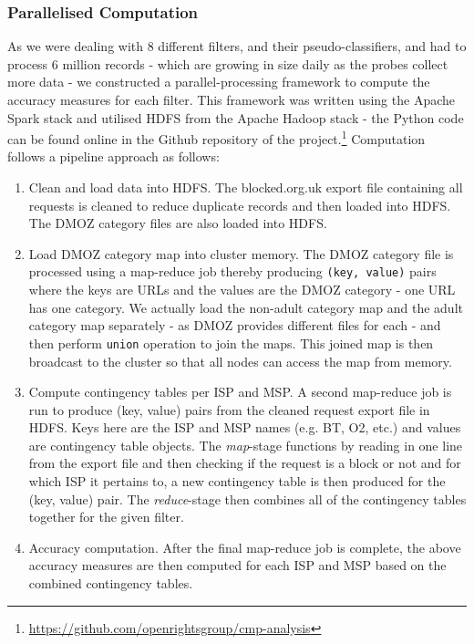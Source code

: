 \documentclass{bmcart}
\begin{document}
\subsubsection*{Parallelised Computation}
As we were dealing with 8 different filters, and their pseudo-classifiers, and had to process 6 million records - which are growing in size daily as the probes collect more data - we constructed a parallel-processing framework to compute the accuracy measures for each filter.
This framework was written using the Apache Spark stack and utilised HDFS from the Apache Hadoop stack - the Python code can be found online in the Github repository of the project.\footnote{\url{https://github.com/openrightsgroup/cmp-analysis}}
Computation follows a pipeline approach as follows:
\begin{enumerate}
	\item Clean and load data into HDFS. The blocked.org.uk export file containing all requests is cleaned to reduce duplicate records and then loaded into HDFS.
	The DMOZ category files are also loaded into HDFS.
	\item Load DMOZ category map into cluster memory. The DMOZ category file is processed using a map-reduce job thereby producing \texttt{(key, value)} pairs where the keys are URLs and the values are the DMOZ category - one URL has one category. 
	We actually load the non-adult category map and the adult category map separately - as DMOZ provides different files for each - and then perform \texttt{union} operation to join the maps.
	This joined map is then broadcast to the cluster so that all nodes can access the map from memory.
	\item Compute contingency tables per ISP and MSP. A second map-reduce job is run to produce (key, value) pairs from the cleaned request export file in HDFS.
	Keys here are the ISP and MSP names (e.g. BT, O2, etc.) and values are contingency table objects.
	The \textit{map}-stage functions by reading in one line from the export file and then checking if the request is a block or not and for which ISP it pertains to, a new contingency table is then produced for the (key, value) pair.
	The \textit{reduce}-stage then combines all of the contingency tables together for the given filter.
	\item Accuracy computation. After the final map-reduce job is complete, the above accuracy measures are then computed for each ISP and MSP based on the combined contingency tables.
\end{enumerate}
\end{document}
